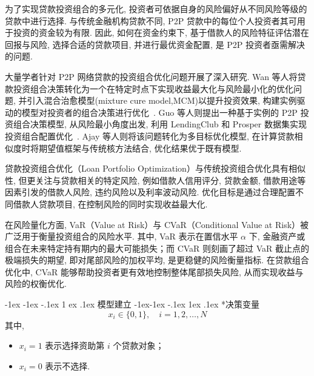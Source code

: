 \documentclass[12pt,nonblindrev]{write_paper}
\makeatletter
\renewcommand\section{\@startsection {section}{1}{\z@}%
                                   {-1ex \@plus -1ex \@minus -.1ex}%
                                   {1 ex \@plus.1ex}%
                                   {\normalfont\large\bfseries}}
\renewcommand\subsection{\@startsection{subsection}{2}{\z@}%
                                     {-1ex\@plus -1ex \@minus -.1ex}%
                                     {1ex \@plus .1ex}%
                                     {\normalfont \normalsize \bfseries}}
\makeatother
\begin{document}
为了实现贷款投资组合的多元化, 投资者可依据自身的风险偏好从不同风险等级的贷款中进行选择. 与传统金融机构贷款不同, P2P 贷款中的每位个人投资者其可用于投资的资金较为有限. 因此, 如何在资金约束下, 基于借款人的风险特征评估潜在回报与风险, 选择合适的贷款项目, 并进行最优资金配置, 是 P2P 投资者亟需解决的问题. 

大量学者针对 P2P 网络贷款的投资组合优化问题开展了深入研究. Wan 等人将贷款投资组合决策转化为一个在特定时点下实现收益最大化与风险最小化的优化问题, 并引入混合治愈模型(mixture cure model,MCM)以提升投资效果, 构建实例驱动的模型对投资者的组合决策进行优化~\cite{wan2023hybrid}. Guo 等人则提出一种基于实例的 P2P 投资组合决策模型, 从风险最小角度出发, 利用 LendingClub 和 Prosper 数据集实现投资组合配置优化~\cite{guo2016instance}. Ajay 等人则将该问题转化为多目标优化模型, 在计算贷款相似度时将期望值框架与传统核方法结合, 优化结果优于既有模型\cite{byanjankar2021data}.

贷款投资组合优化（Loan Portfolio Optimization）与传统投资组合优化具有相似性, 但更关注与贷款相关的特定风险, 例如借款人信用评分, 贷款金额, 借款用途等因素引发的借款人风险, 违约风险以及利率波动风险. 优化目标是通过合理配置不同借款人贷款项目, 在控制风险的同时实现收益最大化. 

在风险量化方面, VaR（Value at Risk）与 CVaR（Conditional Value at Risk）被广泛用于衡量投资组合的风险水平. 其中, VaR 表示在置信水平 $\alpha$ 下, 金融资产或组合在未来特定持有期内的最大可能损失；而 CVaR 则刻画了超过 VaR 截止点的极端损失的期望, 即对尾部风险的加权平均, 是更稳健的风险衡量指标. 在贷款组合优化中, CVaR 能够帮助投资者更有效地控制整体尾部损失风险, 从而实现收益与风险的权衡优化. 



\section{模型建立}
\subsection*{决策变量}
\[
x_i \in \{0, 1\}, \quad i = 1, 2, \ldots, N
\]
其中, 
\begin{itemize}
  \item $x_i = 1$ 表示选择资助第 $i$ 个贷款对象；
  \item $x_i = 0$ 表示不选择. 
\end{itemize}
\end{document}
